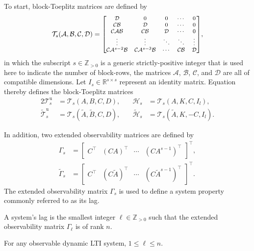 To start, block-Toeplitz matrices are defined by
\begin{align}\label{eqn:blockToeplitz} 
\mathcal{T}_s(\mathcal{A},\mathcal{B},\mathcal{C},\mathcal{D}) =\scriptsize{
	\begin{bmatrix}
		\mathcal{D}         & 0         & 0      & \cdots  & 0\\
		\mathcal{C}\mathcal{B}        & \mathcal{D}         & 0      & \cdots  & 0\\
		\mathcal{C}\mathcal{A}\mathcal{B}       & \mathcal{C}\mathcal{B}        & \mathcal{D}      & \cdots & 0\\
		\vdots    &  \vdots & \ddots & \ddots & \vdots\\
		\mathcal{C}\mathcal{A}^{s-2}\mathcal{B} & \mathcal{C}\mathcal{A}^{s-3}\mathcal{B} & \cdots  & \mathcal{C}\mathcal{B}     & \mathcal{D}
	\end{bmatrix}},
\end{align}
in which the subscript $s\in\mathbb{Z}_{>0}$ is a generic strictly-positive integer that is used here to indicate the number of block-rows, the matrices $\mathcal{A}$, $\mathcal{B}$, $\mathcal{C}$, and $\mathcal{D}$ are all of compatible dimensions. Let ${I_s\in\mathbb{R}^{s\times s}}$ represent an identity matrix. Equation~ thereby defines the block-Toeplitz matrices
\begin{alignat*}{2}
\mathcal{T}_s^\mathrm{u}&=\mathcal{T}_s(A,B,C,D),\quad  &\mathcal{H}_s&=\mathcal{T}_s(A,K,C,I_l),\\
\widetilde{\mathcal{T}}_s^\mathrm{u}&=\mathcal{T}_s(\tilde{A},\tilde{B},C,D),\quad  &\widetilde{\mathcal{H}}_s&=\mathcal{T}_s(\tilde{A},K,-C,I_l).
\end{alignat*}

In addition, two extended observability matrices are defined by
\begin{align*}
\Gamma_s &= \begin{bmatrix}C^\top & (CA)^\top & \cdots & (CA^{s-1})^\top\end{bmatrix}^\top,\\%
\widetilde{\Gamma}_s &= \begin{bmatrix}C^\top & (C\tilde{A})^\top & \cdots & (C\tilde{A}^{s-1})^\top\end{bmatrix}^\top.
\end{align*}
The extended observability matrix $\Gamma_s$ is used to define a system property commonly referred to as its lag.
\begin{defn}\label{def:lag}
    A system's lag is the smallest integer $\ell\in\mathbb{Z}_{>0}$ such that the extended observability matrix $\Gamma_\ell$ is of rank $n$.
\end{defn}
For any observable dynamic \ac{LTI} system, $1\leq \ell \leq n$.

